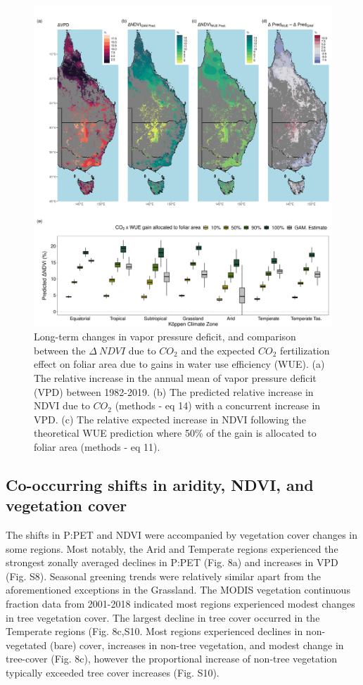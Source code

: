 \documentclass[gc, manuscript]{copernicus}
\begin{document}
\clearpage
\begin{figure}
\includegraphics[width=14cm]{../../figures/Fig7_map_dVpd_gamCO2Pred_wueCO2Pred_dDifferenceBoxplot} \caption{Long-term changes in vapor pressure deficit, and comparison between the $\Delta~NDVI$ due to $CO_2$ and the expected $CO_2$ fertilization effect on foliar area due to gains in water use efficiency (WUE). (a) The relative increase in the annual mean of vapor pressure deficit (VPD) between 1982-2019. (b) The predicted relative increase in NDVI due to $CO_2$ (methods - eq 14) with a concurrent increase in VPD. (c) The relative expected increase in NDVI following the theoretical WUE prediction where 50\% of the gain is allocated to foliar area (methods - eq 11).}\label{fig:unnamed-chunk-6}
\end{figure}
\clearpage

\subsection{Co-occurring shifts in aridity, NDVI, and vegetation cover}

The shifts in P:PET and NDVI were accompanied by vegetation cover
changes in some regions. Most notably, the Arid and Temperate regions
experienced the strongest zonally averaged declines in P:PET (Fig. 8a)
and increases in VPD (Fig. S8). Seasonal greening trends were relatively
similar apart from the aforementioned exceptions in the Grassland. The
MODIS vegetation continuous fraction data from 2001-2018 indicated most
regions experienced modest changes in tree vegetation cover. The largest
decline in tree cover occurred in the Temperate regions (Fig. 8c,S10.
Most regions experienced declines in non-vegetated (bare) cover,
increases in non-tree vegetation, and modest change in tree-cover (Fig.
8c), however the proportional increase of non-tree vegetation typically
exceeded tree cover increases (Fig. S10).
\end{document}
